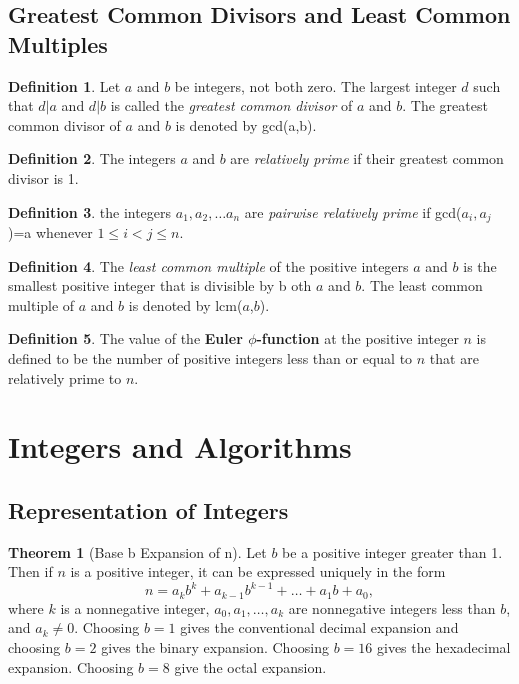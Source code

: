 \documentclass[11pt]{book} %
\theoremstyle {definition}
\newtheorem {definition}{Definition}[section]
\newtheorem {theorem}{Theorem}[section]
\theoremstyle {remark}
\begin{document}
  \subsection {Greatest Common Divisors and Least Common Multiples}
\begin{definition}
Let $a$ and $b$ be integers, not both zero. The largest integer $d$ such that $d \vert a$ and $d \vert b$ is called the \textit{greatest common divisor} of $a$ and $b$. The greatest common divisor of $a$ and $b$ is denoted by gcd(a,b).
\end{definition}

\begin{definition}
The integers $a$ and $b$ are \textit{relatively prime} if their greatest common divisor is 1.
\end{definition}

\begin{definition}
the integers $a_1,a_2, \dots a_n$ are \textit{pairwise relatively prime} if gcd($a_i,a_j$)=a whenever $1\le i < j \le n$.
\end{definition}

\begin{definition}
The \textit{least common multiple} of the positive integers $a$ and $b$ is the smallest positive integer that is divisible by b oth $a$ and $b$. The least common multiple of $a$ and $b$ is denoted by lcm($a$,$b$).
\end{definition}

\begin{definition}
The value of the \textbf{Euler $\phi$-function} at the positive integer $n$ is defined to be the number of positive integers less than or equal to $n$ that are relatively prime to $n$. 
\end{definition}







\section {Integers and Algorithms}
  \subsection {Representation of Integers}
\begin{theorem}[Base b Expansion of n]
Let $b$ be a positive integer greater than 1. Then if $n$ is a positive integer, it can be expressed uniquely in the form
$$n=a_kb^k+a_{k-1}b^{k-1}+ \dots +a_1b + a_0,$$
where $k$ is a nonnegative integer, $a_0,a_1, \dots,a_k$ are nonnegative integers less than $b$, and $a_k\neq0$. Choosing $b=1$ gives the conventional decimal expansion and choosing $b=2$ gives the binary expansion. Choosing $b=16$ gives the hexadecimal expansion. Choosing $b=8$ give the octal expansion.
\end{theorem}
\end{document}
